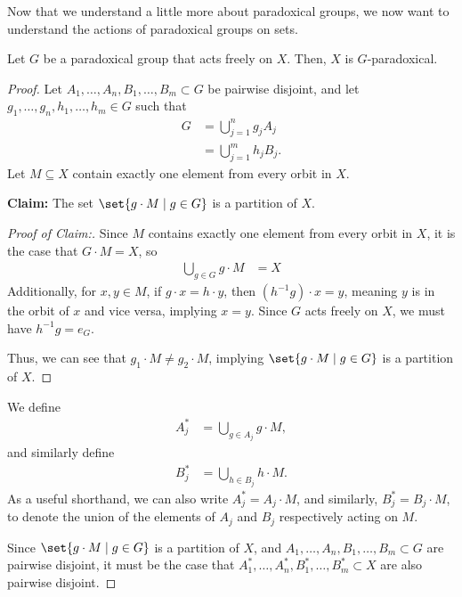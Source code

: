 Now that we understand a little more about paradoxical groups, we now want to understand the actions of paradoxical groups on sets.
\begin{proposition}
  Let $G$ be a paradoxical group that acts freely on $X$. Then, $X$ is $G$-paradoxical.
\end{proposition}
\begin{proof}
  Let $A_1,\dots,A_n,B_1,\dots,B_m\subset G$ be pairwise disjoint, and let $g_1,\dots,g_n,h_1,\dots,h_m\in G$ such that
  \begin{align*}
    G &= \bigcup_{j=1}^{n}g_jA_j\\
      &= \bigcup_{j=1}^{m}h_jB_j.
  \end{align*}
  Let $M\subseteq X$ contain exactly one element from every orbit in $X$.\newline

  \textbf{Claim:} The set $\set{g\cdot M\mid g\in G}$ is a partition of $X$.\\
  \vspace{12pt}
  \begin{proof}[Proof of Claim:]
  Since $M$ contains exactly one element from every orbit in $X$, it is the case that $G\cdot M = X$, so
  \begin{align*}
    \bigcup_{g\in G} g\cdot M &= X
  \end{align*}
  Additionally, for $x,y\in M$, if $g\cdot x = h\cdot y$, then $\left(h^{-1}g\right)\cdot x = y$, meaning $y$ is in the orbit of $x$ and vice versa, implying $x = y$. Since $G$ acts freely on $X$, we must have $h^{-1}g = e_G$.\newline

  Thus, we can see that $g_1\cdot M \neq g_2\cdot M$, implying $\set{g\cdot M\mid g\in G}$ is a partition of $X$.
  \end{proof}

  We define
  \begin{align*}
    A_j^{\ast} &= \bigcup_{g\in A_j}g\cdot M,
  \end{align*}
  and similarly define
  \begin{align*}
    B_j^{\ast} &= \bigcup_{h\in B_j}h\cdot M.
  \end{align*}
  As a useful shorthand, we can also write $A_j^{\ast} = A_j\cdot M$, and similarly, $B_j^{\ast} = B_j\cdot M$, to denote the union of the elements of $A_j$ and $B_j$ respectively acting on $M$.\newline

  Since $\set{g\cdot M\mid g\in G}$ is a partition of $X$, and $A_1,\dots,A_n,B_1,\dots,B_m\subset G$ are pairwise disjoint, it must be the case that $A_1^{\ast},\dots,A_n^{\ast},B_1^{\ast},\dots,B_m^{\ast}\subset X$ are also pairwise disjoint.\newline


\end{proof}
